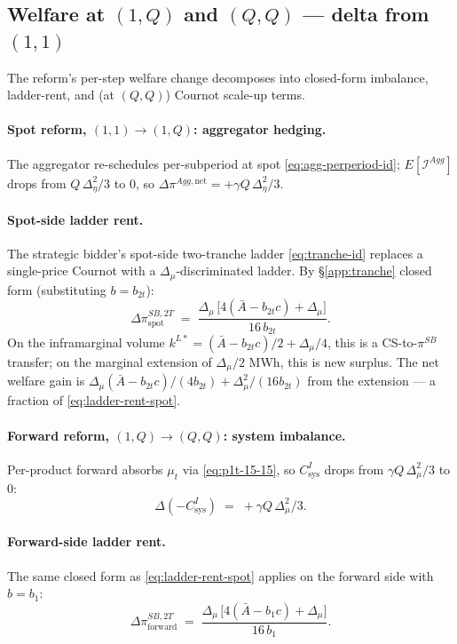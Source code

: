 \documentclass[11pt]{article}
\begin{document}
\subsection{Welfare at $(1,Q)$ and $(Q,Q)$ --- delta from $(1,1)$}\label{app:welfare:reform}

The reform's per-step welfare change decomposes into closed-form imbalance, ladder-rent, and (at $(Q,Q)$) Cournot scale-up terms.

\paragraph{Spot reform, $(1,1)\to(1,Q)$: aggregator hedging.} The aggregator re-schedules per-subperiod at spot \eqref{eq:agg-perperiod-id}; $E[\mathcal{I}^{Agg}]$ drops from $Q\,\Delta_\eta^2/3$ to $0$, so $\Delta \pi^{Agg,\text{net}} = +\gamma Q\,\Delta_\eta^2/3$.

\paragraph{Spot-side ladder rent.} The strategic bidder's spot-side two-tranche ladder \eqref{eq:tranche-id} replaces a single-price Cournot with a $\Delta_\mu$-discriminated ladder. By \S\ref{app:tranche} closed form (substituting $b = b_{2t}$):
\begin{equation}
\Delta \pi^{SB,2T}_{\text{spot}} \;=\; \frac{\Delta_\mu\,\big[4(\bar A - b_{2t} c) + \Delta_\mu\big]}{16\, b_{2t}}.
\label{eq:ladder-rent-spot}
\end{equation}
On the inframarginal volume $k^{L*} = (\bar A - b_{2t} c)/2 + \Delta_\mu/4$, this is a CS-to-$\pi^{SB}$ transfer; on the marginal extension of $\Delta_\mu/2$ MWh, this is new surplus. The net welfare gain is $\Delta_\mu(\bar A - b_{2t}c)/(4 b_{2t}) + \Delta_\mu^2/(16 b_{2t})$ from the extension --- a fraction of \eqref{eq:ladder-rent-spot}.

\paragraph{Forward reform, $(1,Q)\to(Q,Q)$: system imbalance.} Per-product forward absorbs $\mu_t$ via \eqref{eq:p1t-15-15}, so $C^I_{\text{sys}}$ drops from $\gamma Q\,\Delta_\mu^2/3$ to $0$:
\[
\Delta(-C^I_{\text{sys}}) \;=\; +\gamma Q\,\Delta_\mu^2/3.
\]

\paragraph{Forward-side ladder rent.} The same closed form as \eqref{eq:ladder-rent-spot} applies on the forward side with $b = b_1$:
\begin{equation}
\Delta \pi^{SB,2T}_{\text{forward}} \;=\; \frac{\Delta_\mu\,\big[4(\bar A - b_1 c) + \Delta_\mu\big]}{16\, b_1}.
\label{eq:ladder-rent-forward}
\end{equation}
\end{document}
